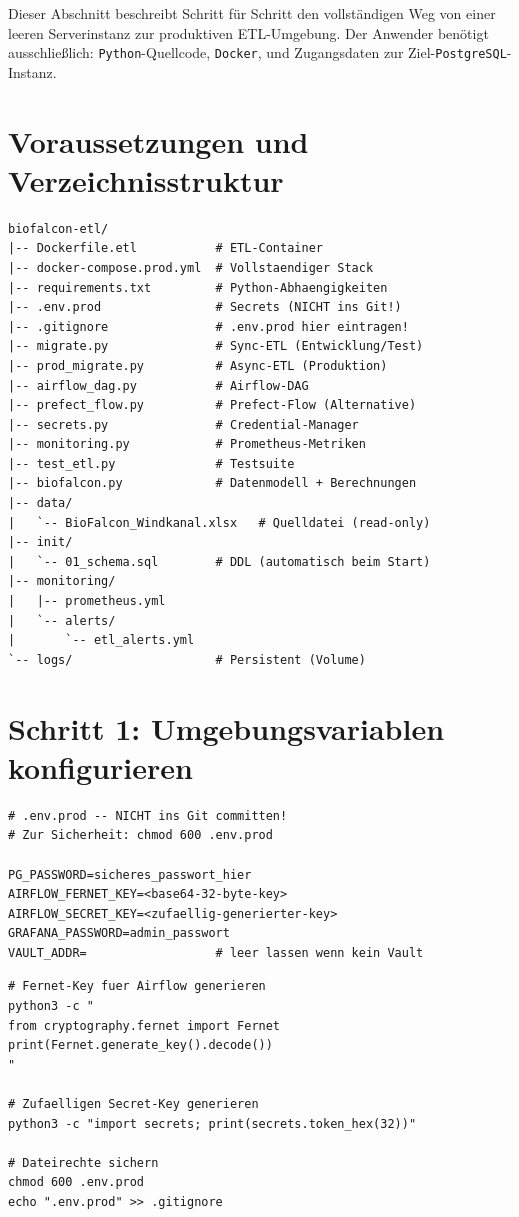 \documentclass[12pt,a4paper]{report}
\theoremstyle{definition}
\theoremstyle{remark}
\newcommand{\pg}{\texttt{PostgreSQL}}
\newcommand{\py}{\texttt{Python}}
\newcommand{\docker}{\texttt{Docker}}
\begin{document}
Dieser Abschnitt beschreibt Schritt für Schritt den vollständigen
Weg von einer leeren Serverinstanz zur produktiven ETL-Umgebung.
Der Anwender ben\"otigt ausschlie\ss{}lich: \py-Quellcode, \docker{},
und Zugangsdaten zur Ziel-\pg-Instanz.

\section{Voraussetzungen und Verzeichnisstruktur}

\begin{lstlisting}[style=bash, caption={Verzeichnisstruktur des Produktiv-Deployments}]
biofalcon-etl/
|-- Dockerfile.etl           # ETL-Container
|-- docker-compose.prod.yml  # Vollstaendiger Stack
|-- requirements.txt         # Python-Abhaengigkeiten
|-- .env.prod                # Secrets (NICHT ins Git!)
|-- .gitignore               # .env.prod hier eintragen!
|-- migrate.py               # Sync-ETL (Entwicklung/Test)
|-- prod_migrate.py          # Async-ETL (Produktion)
|-- airflow_dag.py           # Airflow-DAG
|-- prefect_flow.py          # Prefect-Flow (Alternative)
|-- secrets.py               # Credential-Manager
|-- monitoring.py            # Prometheus-Metriken
|-- test_etl.py              # Testsuite
|-- biofalcon.py             # Datenmodell + Berechnungen
|-- data/
|   `-- BioFalcon_Windkanal.xlsx   # Quelldatei (read-only)
|-- init/
|   `-- 01_schema.sql        # DDL (automatisch beim Start)
|-- monitoring/
|   |-- prometheus.yml
|   `-- alerts/
|       `-- etl_alerts.yml
`-- logs/                    # Persistent (Volume)
\end{lstlisting}

\section{Schritt 1: Umgebungsvariablen konfigurieren}

\begin{lstlisting}[style=bash, caption={.env.prod: Produktivkonfiguration (Beispiel)}]
# .env.prod -- NICHT ins Git committen!
# Zur Sicherheit: chmod 600 .env.prod

PG_PASSWORD=sicheres_passwort_hier
AIRFLOW_FERNET_KEY=<base64-32-byte-key>
AIRFLOW_SECRET_KEY=<zufaellig-generierter-key>
GRAFANA_PASSWORD=admin_passwort
VAULT_ADDR=                  # leer lassen wenn kein Vault
\end{lstlisting}

\begin{lstlisting}[style=bash, caption={Generierung sicherer Schlussel}]
# Fernet-Key fuer Airflow generieren
python3 -c "
from cryptography.fernet import Fernet
print(Fernet.generate_key().decode())
"

# Zufaelligen Secret-Key generieren
python3 -c "import secrets; print(secrets.token_hex(32))"

# Dateirechte sichern
chmod 600 .env.prod
echo ".env.prod" >> .gitignore
\end{lstlisting}
\end{document}

